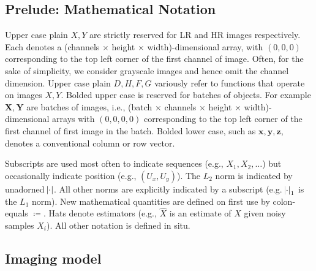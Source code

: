 \subsection{Prelude: Mathematical Notation}\label{subsec:notation}

Upper case plain \(X, Y\) are strictly reserved for LR and HR images respectively.
%
Each denotes a (channels\(\,\times\,\)height\(\,\times\,\)width)-dimensional array, with \((0, 0, 0)\) corresponding to the top left corner of the first channel of image.
%
Often, for the sake of simplicity, we consider grayscale images and hence omit the channel dimension.
%
Upper case plain \(D, H, F, G\) variously refer to functions that operate on images \(X,Y\).
%
Bolded upper case is reserved for batches of objects.
%
For example \(\bm{X}, \bm{Y}\) are batches of images, i.e., (batch\(\,\times\,\)channels\(\,\times\,\)height\(\,\times\,\)width)-dimensional arrays with \((0, 0, 0, 0)\) corresponding to the top left corner of the first channel of first image in the batch.
%
Bolded lower case, such as \(\bm{x}, \bm{y}, \bm{z}\), denotes a conventional column or row vector.

Subscripts are used most often to indicate sequences (e.g., \(X_1, X_2, \dots\)) but occasionally indicate position (e.g., \((U_x, U_y)\)).
%
The \(L_2\) norm is indicated by unadorned \(\abs{\cdot}\).
%
All other norms are explicitly indicated by a subscript (e.g. \(\abs{\cdot}_1\) is the \(L_1\) norm).
%
New mathematical quantities are defined on first use by colon-equals \(\coloneqq\).
%
Hats denote estimators (e.g., \(\hat{X}\) is an estimate of \(X\) given noisy samples \(X_i\)).
%
All other notation is defined in situ.

\subsection{Imaging model}\label{subsec:imaging-model}

